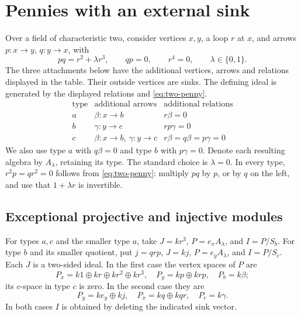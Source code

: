 \section{Pennies with an external sink}\label{sec:attachments}
Over a field of characteristic two, consider vertices $x,y$, a loop $r$ at $x$, and arrows $p:x\to y$, $q:y\to x$, with
\begin{equation}\label{eq:two-penny}
 pq=r^2+\lambda r^3,\qquad qp=0,\qquad r^4=0,
 \qquad \lambda\in\{0,1\}.
\end{equation}
The three attachments below have the additional vertices, arrows and relations displayed in the table. Their outside vertices are sinks. The defining ideal is generated by the displayed relations and \eqref{eq:two-penny}.
\[
\begin{array}{c|c|l}
 \text{type}&\text{additional arrows}&\text{additional relations}\\\hline
 a&\beta:x\to b&r\beta=0\\
 b&\gamma:y\to c&rp\gamma=0\\
 c&\beta:x\to b,\ \gamma:y\to c&r\beta=q\beta=p\gamma=0
\end{array}
\]
We also use type $a$ with $q\beta=0$ and type $b$ with $p\gamma=0$. Denote each resulting algebra by $A_\lambda$, retaining its type. The standard choice is $\lambda=0$. In every type, $r^2p=qr^2=0$ follows from \eqref{eq:two-penny}: multiply $pq$ by $p$, or by $q$ on the left, and use that $1+\lambda r$ is invertible.

\subsection{Exceptional projective and injective modules}
For types $a,c$ and the smaller type $a$, take $J=kr^3$, $P=e_xA_\lambda$, and $I=P/S_b$. For type $b$ and its smaller quotient, put $j=qrp$, $J=kj$, $P=e_yA_\lambda$, and $I=P/S_c$. Each $J$ is a two-sided ideal. In the first case the vertex spaces of $P$ are
\[
 P_x=k1\oplus kr\oplus kr^2\oplus kr^3,\quad P_y=kp\oplus krp,\quad P_b=k\beta;
\]
its $c$-space in type $c$ is zero. In the second case they are
\[
 P_y=ke_y\oplus kj,\quad P_x=kq\oplus kqr,\quad P_c=k\gamma.
\]
In both cases $I$ is obtained by deleting the indicated sink vector.

